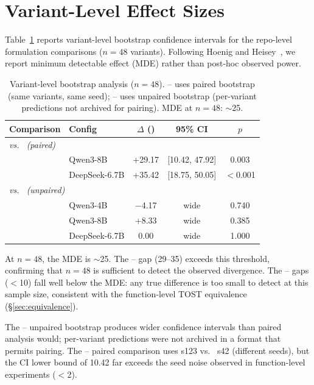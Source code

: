 \section{Variant-Level Effect Sizes}
\label{app:power}

Table~\ref{tab:variant_power} reports variant-level bootstrap confidence intervals for the repo-level formulation comparisons ($n{=}48$ variants). Following Hoenig and Heisey~\cite{hoenig2001}, we report minimum detectable effect (MDE) rather than post-hoc observed power.

\begin{table}[h]
\centering
\small
\caption{Variant-level bootstrap analysis ($n{=}48$). \cls{}--\cwm{} uses paired bootstrap (same variants, same seed); \cls{}--\traj{} uses unpaired bootstrap (per-variant \traj{} predictions not archived for pairing). MDE at $n{=}48$: ${\sim}$25\pp{}.}
\label{tab:variant_power}
\setlength{\tabcolsep}{6pt}
\begin{tabular}{llccc}
\toprule
\textbf{Comparison} & \textbf{Config} & \textbf{$\Delta$ (\pp{})} & \textbf{95\% CI} & \textbf{$p$} \\
\midrule
\multicolumn{5}{l}{\emph{\cls{} vs.\ \cwm{} (paired)}} \\
& Qwen3-8B & +29.17 & [10.42, 47.92] & 0.003 \\
& DeepSeek-6.7B & +35.42 & [18.75, 50.05] & ${<}$0.001 \\
\midrule
\multicolumn{5}{l}{\emph{\cls{} vs.\ \traj{} (unpaired)}} \\
& Qwen3-4B & $-$4.17 & wide & 0.740 \\
& Qwen3-8B & +8.33 & wide & 0.385 \\
& DeepSeek-6.7B & 0.00 & wide & 1.000 \\
\bottomrule
\end{tabular}
\end{table}

At $n{=}48$, the MDE is ${\sim}$25\pp{}. The \cls{}--\cwm{} gap (29--35\pp{}) exceeds this threshold, confirming that $n{=}48$ is sufficient to detect the observed divergence. The \cls{}--\traj{} gaps ($<$10\pp{}) fall well below the MDE: any true difference is too small to detect at this sample size, consistent with the function-level TOST equivalence (\S\ref{sec:equivalence}).

The \cls{}--\traj{} unpaired bootstrap produces wider confidence intervals than paired analysis would; \traj{} per-variant predictions were not archived in a format that permits pairing. The \cls{}--\cwm{} paired comparison uses \cls{} s123 vs.\ \cwm{} s42 (different seeds), but the CI lower bound of 10.42\pp{} far exceeds the seed noise observed in function-level experiments ($<$2\pp{}).


